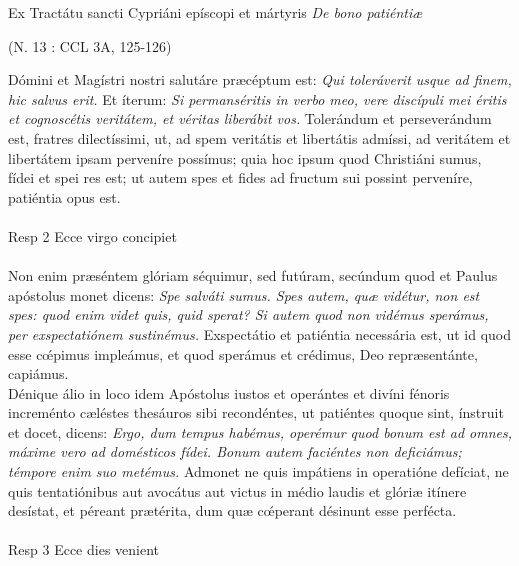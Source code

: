 \documentclass[options]{article}
\begin{document}
Ex Tractátu sancti Cypriáni epíscopi et mártyris \emph{De bono patiéntiæ}
\begin{flushright}
	(N. 13 : CCL 3A, 125-126)
\end{flushright}
Dómini et Magístri nostri salutáre præcéptum est: \emph{Qui toleráverit usque ad finem, hic salvus erit.} Et íterum: \emph{Si permanséritis in verbo meo, vere discípuli mei éritis et cognoscétis veritátem, et véritas liberábit vos.} Tolerándum et perseverándum est, fratres dilectíssimi, ut, ad spem veritátis et libertátis admíssi, ad veritátem et libertátem ipsam perveníre possímus; quia hoc ipsum quod Christiáni sumus, fídei et spei res est; ut autem spes et fides ad fructum sui possint perveníre, patiéntia opus est.\\
\\
Resp 2  Ecce virgo concipiet\\
\\
Non enim præséntem glóriam séquimur, sed futúram, secúndum quod et Paulus apóstolus monet dicens: \emph{Spe salváti sumus. Spes autem, quæ vidétur, non est spes: quod enim videt quis, quid sperat? Si autem quod non vidémus sperámus, per exspectatiónem sustinémus.} Exspectátio et patiéntia necessária est, ut id quod esse c\'{œ}pimus impleámus, et quod sperámus et crédimus, Deo repræsentánte, capiámus.\\
Dénique álio in loco idem Apóstolus iustos et operántes et divíni fénoris increménto cæléstes thesáuros sibi recondéntes, ut patiéntes quoque sint, ínstruit et docet, dicens: \emph{Ergo, dum tempus habémus, operémur quod bonum est ad omnes, máxime vero ad domésticos fídei. Bonum autem faciéntes non deficiámus; témpore enim suo metémus.} Admonet ne quis impátiens in operatióne defíciat, ne quis tentatiónibus aut avocátus aut victus in médio laudis et glóriæ itínere desístat, et péreant prætérita, dum quæ c\'{œ}perant désinunt esse perfécta.\\
\\
Resp 3 Ecce dies venient
	
\end{document}

